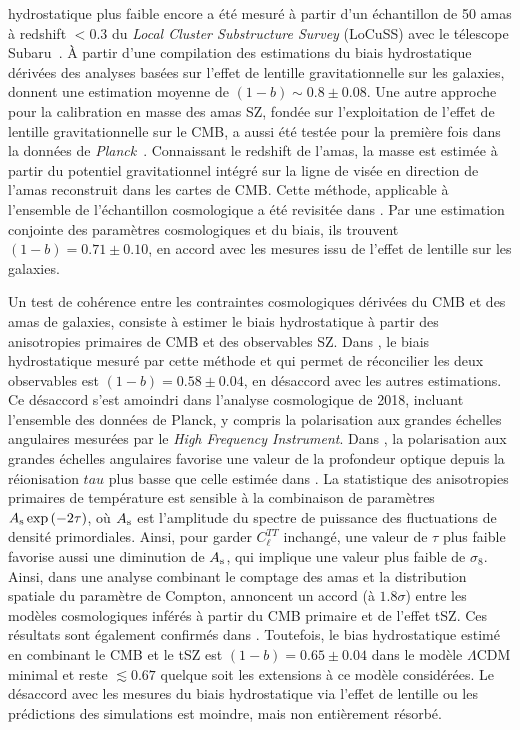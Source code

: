 hydrostatique plus faible encore a été mesuré à partir d'un
échantillon de 50 amas à redshift $<0.3$ du \emph{Local Cluster
Substructure Survey} (LoCuSS) avec le télescope
Subaru~\citep{Smith2016}. \`A partir d'une compilation des estimations
du biais hydrostatique dérivées des analyses basées sur l'effet de
lentille gravitationnelle sur les galaxies, \citet{Salvati2018}
donnent une estimation moyenne de $(1-b) \sim 0.8 \pm 0.08$. 
Une autre approche pour la calibration en masse des amas SZ, fondée
sur l'exploitation de l'effet de lentille gravitationnelle sur le CMB,
a aussi été testée pour la première fois dans la données
de \emph{Planck}~\citep{Melin2015, Planck_2016_SZ_cosmo}. Connaissant
le redshift de l'amas, la masse est estimée à partir du potentiel
gravitationnel intégré sur la ligne de visée en direction de l'amas
reconstruit dans les cartes de CMB.
Cette méthode, applicable à l'ensemble de l'échantillon cosmologique a été
revisitée dans \citet{Zulbedia2019}. Par une estimation conjointe des
paramètres cosmologiques et du biais, ils trouvent $(1-b) = 0.71 \pm
0.10$, en accord avec les mesures issu de l'effet de lentille sur les
galaxies.


Un test de cohérence entre les contraintes cosmologiques dérivées du
CMB et des amas de galaxies, consiste à estimer le biais hydrostatique
à partir des anisotropies primaires de CMB et des observables SZ. Dans
\citet{Planck_2016_SZ_cosmo}, le biais hydrostatique mesuré par cette
méthode et qui permet de réconcilier les deux observables est
$(1-b) = 0.58 \pm 0.04$, en désaccord avec les autres estimations. Ce
désaccord s'est amoindri dans l'analyse cosmologique de 2018, incluant
l'ensemble des données de Planck, y compris la polarisation aux
grandes échelles angulaires mesurées par le \emph{High Frequency
Instrument}. Dans \citet{Planck_2018_cosmo}, la polarisation aux
grandes échelles angulaires favorise une valeur de la profondeur
optique depuis la réionisation $tau$ plus basse que celle estimée
dans \citet{Planck_2016_cosmo}. La statistique des anisotropies
primaires de température est sensible à la combinaison de paramètres
$A_{\rm{s}} \exp{(-2\tau)}$, où $A_{\rm{s}}$ est l'amplitude du spectre
de puissance des fluctuations de densité primordiales. Ainsi, pour
garder $C_\ell^{TT}$ inchangé, une valeur de $\tau$ plus faible
favorise aussi une diminution de $A_{\rm{s}}$, qui implique une valeur
plus faible de $\sigma_8$. Ainsi, dans une analyse combinant le
comptage des amas et la distribution spatiale du paramètre de
Compton, \citet{Salvati2018} annoncent un accord (à $1.8\sigma$) entre
les modèles cosmologiques inférés à partir du CMB primaire et de
l'effet tSZ. Ces résultats sont également confirmés
dans \citet{Zulbedia2019}. Toutefois, le bias hydrostatique estimé en
combinant le CMB et le tSZ est $(1-b) = 0.65 \pm 0.04$ dans le modèle
$\Lambda$CDM minimal et reste $\lesssim 0.67$ quelque soit les
extensions à ce modèle considérées. Le désaccord avec les
mesures du biais hydrostatique via l'effet de lentille ou les
prédictions des simulations est moindre, mais non entièrement
résorbé. 

